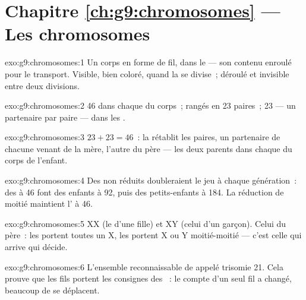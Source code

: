 \section*{Chapitre \ref{ch:g9:chromosomes} --- Les chromosomes}

\begin{solution}{exo:g9:chromosomes:1}
Un corps en forme de fil, dans le  --- son contenu
enroulé pour le transport. Visible, bien coloré, quand la
 se divise~; déroulé et invisible entre deux
divisions.
\end{solution}

\begin{solution}{exo:g9:chromosomes:2}
46 dans chaque  du corps~; rangés en 23 paires~; 23
--- un partenaire par paire --- dans les .
\end{solution}

\begin{solution}{exo:g9:chromosomes:3}
$23 + 23 = 46$~: la  rétablit les paires, un
partenaire de chacune venant de la mère, l'autre du père ---
les deux parents dans chaque  du corps de l'enfant.
\end{solution}

\begin{solution}{exo:g9:chromosomes:4}
Des  non réduits doubleraient le jeu à chaque
génération~: des  à 46 font des enfants à 92, puis
des petits-enfants à 184. La réduction de moitié maintient
l' à 46.
\end{solution}

\begin{solution}{exo:g9:chromosomes:5}
XX (le  d'une fille) et XY (celui d'un garçon).
Celui du père~: les  portent toutes un X, les
 portent X ou Y moitié-moitié --- c'est celle
qui arrive qui décide.
\end{solution}

\begin{solution}{exo:g9:chromosomes:6}
L'ensemble reconnaissable de  appelé trisomie 21.
Cela prouve que les fils portent les consignes des
~: le compte d'un seul fil a changé, beaucoup de
 se déplacent.
\end{solution}

